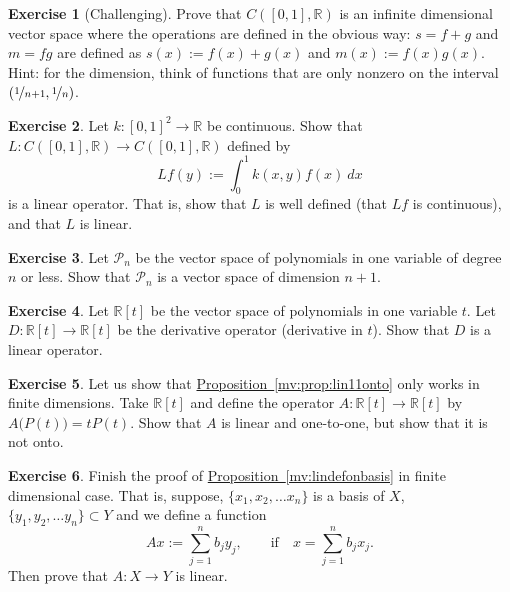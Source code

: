 \documentclass[12pt]{book}
\newcommand{\R}{{\mathbb{R}}}
\newcommand{\sP}{{\mathcal{P}}}
\theoremstyle{plain}
\theoremstyle{remark}
\theoremstyle{definition}
\theoremstyle{exercise}
\newtheorem{exercise}{Exercise}[section]
\theoremstyle{example}
\newcommand{\propref}[1]{\hyperref[#1]{Proposition~\ref*{#1}}}
\begin{document}
\begin{exercise}[Challenging]
Prove that $C([0,1],\R)$ is an infinite dimensional vector space
where the operations are defined in the obvious way:
$s=f+g$ and $m=fg$ are defined as
$s(x) := f(x)+g(x)$ and
$m(x) := f(x)g(x)$.
Hint: for the dimension, think of functions that are only nonzero
on the interval $(\nicefrac{1}{n+1},\nicefrac{1}{n})$.
\end{exercise}

\begin{exercise}
Let $k \colon [0,1]^2 \to \R$ be continuous.  Show that
$L \colon C([0,1],\R) \to C([0,1],\R)$ defined by
\begin{equation*}
Lf(y) := \int_0^1 k(x,y)f(x)~dx
\end{equation*}
is a linear operator.  That is, show that $L$ is well defined (that
$Lf$ is continuous), and that $L$ is linear.
\end{exercise}

\begin{exercise}
Let $\sP_n$ be the vector space of polynomials in one variable of degree $n$
or less.  Show that $\sP_n$ is a vector space of dimension $n+1$.
\end{exercise}

\begin{exercise}
Let $\R[t]$ be the vector space of polynomials in one variable $t$.  Let
$D \colon \R[t] \to \R[t]$ be the derivative operator (derivative in $t$).
Show that $D$ is a linear operator.
\end{exercise}

\begin{exercise}
Let us show that \propref{mv:prop:lin11onto} only works in finite
dimensions.  Take $\R[t]$ and define the operator $A \colon \R[t] \to \R[t]$
by $A\bigl(P(t)\bigr) = tP(t)$.  Show that $A$ is linear and one-to-one, but
show that it is not onto.
\end{exercise}

\begin{exercise}
Finish the proof of \propref{mv:lindefonbasis} in finite dimensional case.
That is, suppose,
$\{ x_1, x_2,\ldots x_n \}$ is a basis of $X$,
$\{ y_1, y_2,\ldots y_n \} \subset Y$ and we define a
function
\begin{equation*}
Ax := \sum_{j=1}^n b_j y_j, \qquad \text{if} \quad x=\sum_{j=1}^n b_j x_j .
\end{equation*}
Then prove that $A \colon X \to Y$ is linear.
\end{exercise}
\end{document}
